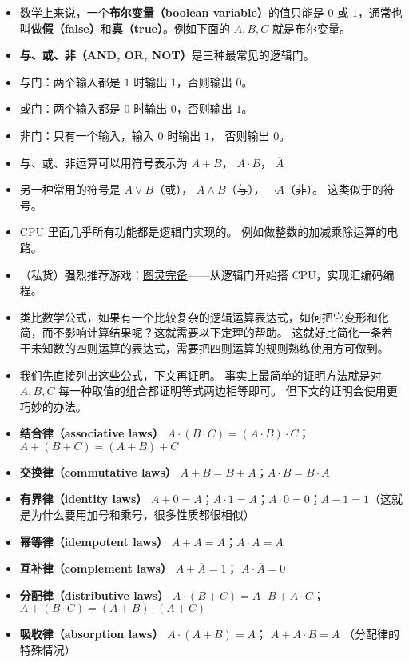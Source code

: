 \begin{itemize}
\item 数学上来说，一个\textbf{布尔变量（boolean variable）}的值只能是 $0$ 或 $1$，通常也叫做\textbf{假（false）}和\textbf{真（true）}。例如下面的 $A,B,C$ 就是布尔变量。
\item \textbf{与、或、非（AND, OR, NOT）}是三种最常见的逻辑门。
\item 与门：两个输入都是 $1$ 时输出 $1$，否则输出 $0$。
\item 或门：两个输入都是 $0$ 时输出 $0$，否则输出 $1$。
\item 非门：只有一个输入，输入 $0$ 时输出 $1$， 否则输出 $0$。
\item 与、或、非运算可以用符号表示为 $A + B$， $A\cdot B$， $\overline A$
\item 另一种常用的符号是 $A\lor B$（或）， $A\land B$（与）， $\neg A$（非）。 这类似于的符号。
\item CPU 里面几乎所有功能都是逻辑门实现的。 例如做整数的加减乘除运算的电路。
\item （私货）强烈推荐游戏：\href{https://turingcomplete.game/}{图灵完备}——从逻辑门开始搭 CPU，实现汇编码编程。
\item 类比数学公式，如果有一个比较复杂的逻辑运算表达式，如何把它变形和化简，而不影响计算结果呢？这就需要以下定理的帮助。 这就好比简化一条若干未知数的四则运算的表达式，需要把四则运算的规则熟练使用方可做到。
\item 我们先直接列出这些公式，下文再证明。 事实上最简单的证明方法就是对 $A,B,C$ 每一种取值的组合都证明等式两边相等即可。 但下文的证明会使用更巧妙的办法。
\item \textbf{结合律（associative laws）} $A\cdot(B\cdot C) = (A\cdot B)\cdot C$； $A+(B+C)=(A+B)+C$
\item \textbf{交换律（commutative laws）} $A+B=B+A$；$A\cdot B=B\cdot A$
\item \textbf{有界律（identity laws）} $A+0=A$；$A\cdot 1=A$；$A\cdot 0 = 0$；$A+1=1$（这就是为什么要用加号和乘号，很多性质都很相似）
\item \textbf{幂等律（idempotent laws）} $A+A=A$；$A\cdot A=A$
\item \textbf{互补律（complement laws）} $A+\overline A = 1$； $A\cdot \overline A = 0$
\item \textbf{分配律（distributive laws）} $A\cdot(B+C)=A\cdot B+A\cdot C$； $A+(B\cdot C) = (A+B)\cdot(A+C)$
\item \textbf{吸收律（absorption laws）} $A\cdot(A+B) = A$； $A+A\cdot B = A$ （分配律的特殊情况）

\end{itemize}

